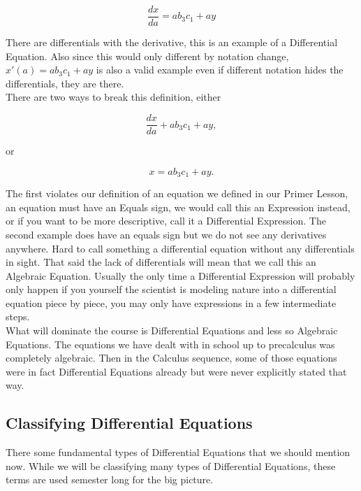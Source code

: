 \documentclass[12pt]{article}
\begin{document}
\begin{equation*}
    \frac{dx}{da} = ab_3c_1+ay
\end{equation*}

There are differentials with the derivative, this is an example of a Differential Equation. Also since this would only different by notation change, $x'(a)=ab_3c_1+ay$ is also a valid example even if different notation hides the differentials, they are there. \\

There are two ways to break this definition, either

\begin{equation*}
    \frac{dx}{da}+ab_3c_1+ay,
\end{equation*}

or

\begin{equation*}
    x=ab_3c_1+ay.
\end{equation*}

The first violates our definition of an equation we defined in our Primer Lesson, an equation must have an Equals sign, we would call this an Expression instead, or if you want to be more descriptive, call it a Differential Expression. The second example does have an equals sign but we do not see any derivatives anywhere. Hard to call something a differential equation without any differentials in sight. That said the lack of differentials will mean that we call this an Algebraic Equation. Usually the only time a Differential Expression will probably only happen if you yourself the scientist is modeling nature into a differential equation piece by piece, you may only have expressions in a few intermediate steps. \\

What will dominate the course is Differential Equations and less so Algebraic Equations. The equations we have dealt with in school up to precalculus was completely algebraic. Then in the Calculus sequence, some of those equations were in fact Differential Equations already but were never explicitly stated that way.

\subsection{Classifying Differential Equations}

There some fundamental types of Differential Equations that we should mention now. While we will be classifying many types of Differential Equations, these terms are used semester long for the big picture. \\
\end{document}

